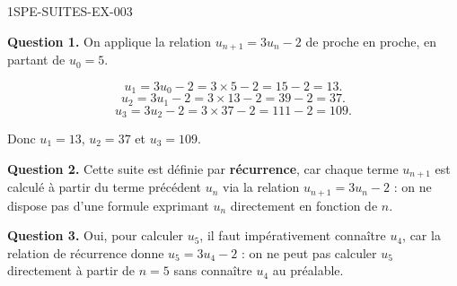\begin{corrige}{1SPE-SUITES-EX-003}


\textbf{Question 1.} On applique la relation $u_{n+1} = 3u_n - 2$ de proche en proche, en partant de $u_0 = 5$.

\[
u_1 = 3u_0 - 2 = 3 \times 5 - 2 = 15 - 2 = 13.
\]
\[
u_2 = 3u_1 - 2 = 3 \times 13 - 2 = 39 - 2 = 37.
\]
\[
u_3 = 3u_2 - 2 = 3 \times 37 - 2 = 111 - 2 = 109.
\]

Donc $u_1 = 13$, $u_2 = 37$ et $u_3 = 109$.


\textbf{Question 2.} Cette suite est définie par \textbf{récurrence}, car chaque terme $u_{n+1}$ est calculé à partir du terme précédent $u_n$ via la relation $u_{n+1} = 3u_n - 2$ : on ne dispose pas d'une formule exprimant $u_n$ directement en fonction de $n$.


\textbf{Question 3.} Oui, pour calculer $u_5$, il faut impérativement connaître $u_4$, car la relation de récurrence donne $u_5 = 3u_4 - 2$ : on ne peut pas calculer $u_5$ directement à partir de $n = 5$ sans connaître $u_4$ au préalable.

\end{corrige}
